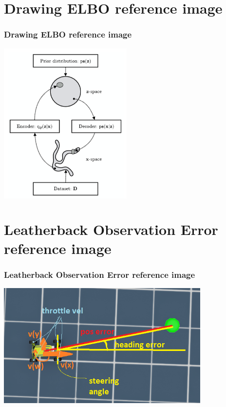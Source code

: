 \documentclass{beamer}
\begin{document}
\section{Drawing ELBO reference image}
\begin{frame}
\frametitle{\textbf{Drawing ELBO reference image}}
\centering
\begin{minipage}{1\textwidth}
    \centering
    \includegraphics[width=0.5\textwidth]{images/ELBO-1.PNG} %
\end{minipage}
\end{frame}


\section{Leatherback Observation Error reference image}
\begin{frame}
\frametitle{\textbf{Leatherback Observation Error reference image}}
\centering
\begin{minipage}{1\textwidth}
    \centering
    \includegraphics[width=0.8\textwidth]{images/observation_errors.png} %
\end{minipage}
\end{frame}
\end{document}
